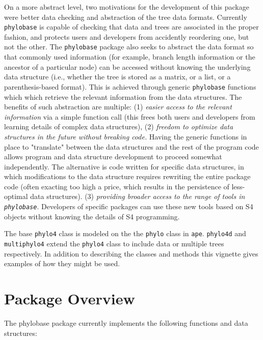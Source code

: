 \documentclass{article}
\newcommand{\code}[1]{{{\tt #1}}}
\begin{document}
On a more abstract level, two motivations for the development of this package were better data checking and abstraction of the tree data formats.  Currently \code{phylobase} is capable of checking that data and trees are associated in the proper fashion, and protects users and developers from accidently reordering one, but not the other.  The \code{phylobase} package also seeks to abstract the data format so that commonly used information (for example, branch length information or the ancestor of a particular node) can be accessed without knowing the underlying data structure (i.e., whether the tree is stored as a matrix, or a list, or a parenthesis-based format).  This is achieved through generic \code{phylobase} functions which which retrieve the relevant information from the data structures. The benefits of such abstraction are multiple: (1) \emph{easier access to the relevant information} via a simple function call (this frees both users and developers from learning details of complex data structures), (2) \emph{freedom to optimize data structures in the future without breaking code.}  Having the generic functions in place to "translate" between the data structures and the rest of the program code allows program and data structure development to proceed somewhat independently. The alternative is code written for specific data structures, in which modifications to the data structure requires rewriting the entire package code (often exacting too high a price, which results in the persistence of less-optimal data structures).  (3) \emph{providing broader access to the range of tools in \code{phylobase}}. Developers of specific packages can use these new tools based on S4 objects without knowing the details of S4 programming.

The base \code{phylo4} class is modeled on the the \code{phylo} class in \code{ape}.  \code{phylo4d} and \code{multiphylo4} extend the \code{phylo4} class to include data or multiple trees respectively.  In addition to describing the classes and methods this vignette gives examples of how they might be used.


\section{Package Overview}

The phylobase package currently implements the following functions and data structures:
\end{document}
